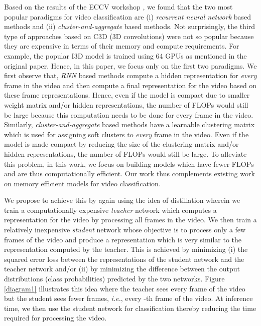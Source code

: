 \documentclass[10pt,twocolumn,letterpaper]{article}
\begin{document}
Based on the results of the ECCV workshop \cite{summary-paper}, we found that the two most popular paradigms for video classification are (i) \textit{recurrent neural network} based methods and (ii) \textit{cluster-and-aggregate} based methods. Not surprisingly, the third type of approaches based on C3D (3D convolutions) \cite{i3d} were not so popular because they are expensive in terms of their memory and compute requirements. For example, the popular I3D model \cite{i3d} is trained using 64 GPUs as mentioned in the original paper. Hence, in this paper, we focus only on the first two paradigms. We first observe that, \textit{RNN} based methods \cite{paper2,paper5,paper9} compute a hidden representation for \textit{every} frame in the video and then compute a final representation for the video based on these frame representations. Hence, even if the model is compact due to smaller weight matrix and/or hidden representations, the number of FLOPs would still be large because this computation needs to be done for every frame in the video. Similarly, \textit{cluster-and-aggregate} based methods \cite{willow,paper1,paper3,paper4,paper10} have a learnable clustering matrix which is used for assigning soft clusters to \textit{every} frame in the video. Even if the model is made compact by reducing the size of the clustering matrix and/or hidden representations, the number of FLOPs would still be large. To alleviate this problem, in this work, we focus on building models which have fewer FLOPs and are thus computationally efficient. Our work thus complements existing work on memory efficient models for video classification.





We propose to achieve 
this by again using the idea of distillation wherein we train a computationally expensive \textit{teacher} network which computes a representation for the video by processing all frames in the video. We then train a relatively inexpensive \textit{student} network whose objective is to process only a few frames of the video and produce a representation which is very similar to the representation computed by the teacher. This is achieved by minimizing (i) the squared error loss between the representations of the student network and the teacher network and/or (ii) by minimizing the difference between the output distributions (class probabilities) predicted by the two networks. Figure \ref{diagram1} illustrates this idea where the teacher sees every frame of the video but the student sees fewer frames, \textit{i.e.}, every -th frame of the video. At inference time, we then use the student network for classification thereby reducing  the time required for processing the video. 
\end{document}
